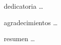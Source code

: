 \documentclass{../extra/memoriaicci}
\begin{document}
\maketitle

\begin{dedicatory}
dedicatoria \ldots
\end{dedicatory}

\begin{acknowledgment}

agradecimientos \ldots

\end{acknowledgment}

\tableofcontents
\listoffigures
\listoftables

\begin{resumen}

resumen \ldots

\end{resumen}


% 





\end{document}
